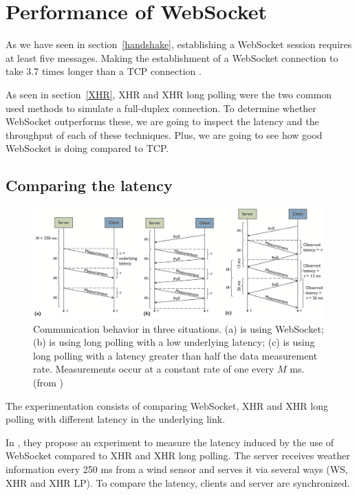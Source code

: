\documentclass[journal,compsoc]{IEEEtran}
\newcommand{\ws}{WebSocket}
\begin{document}
\section{Performance of \ws{}}

As we have seen in section~\ref{handshake}, establishing a \ws{} session requires at least five messages.
Making the establishment of a \ws{} connection to take 3.7 times longer than a TCP connection \cite{performanceEvaluationOfWebsocketProtocol}.

As seen in section~\ref{XHR}, XHR and XHR long polling were the two common used methods to simulate a full-duplex connection.
To determine whether \ws{} outperforms these, we are going to inspect the latency and the throughput of each of these techniques.
Plus, we are going to see how good \ws{} is doing compared to TCP.

\subsection{Comparing the latency}

\begin{figure}[!t]
    \centering
    \includegraphics[width=\textwidth]{comdisp.png}
    \caption{Communication behavior in three situations. (a) is using \ws{}; (b) is using long polling with a low underlying latency; (c) is using long polling with a latency greater than half the data measurement rate. Measurements occur at a constant rate of one every $M$ ms. (from \cite{communicationAndDIsplayingRealTimeDataWithWebSocket})}
    \label{fig:comdisp}
\end{figure}

The experimentation consists of comparing \ws{}, XHR and XHR long polling with different latency in the underlying link.

In \cite{communicationAndDIsplayingRealTimeDataWithWebSocket}, they propose an experiment to measure the latency induced by the use of \ws{} compared to XHR and XHR long polling.
The server receives weather information every 250 ms from a wind sensor and serves it via several ways (WS, XHR and XHR LP).
To compare the latency, clients and server are synchronized.
\end{document}
